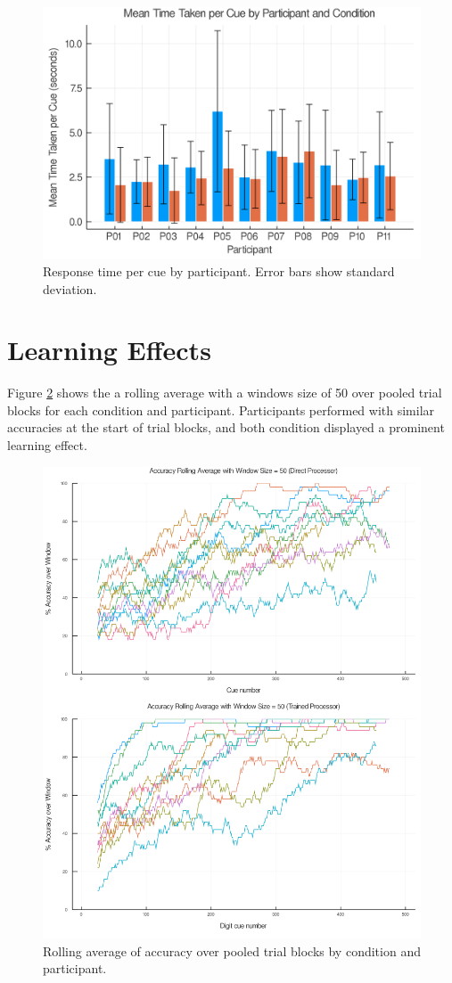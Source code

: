 \documentclass[a4paper,11pt,openany]{book}
\begin{document}
\begin{figure}[htbp]
\centering
\includegraphics[width=.9\linewidth]{./images/response_time_by_participant.png}
\caption{\label{fig:org4ec77b7}
Response time per cue by participant. Error bars show standard deviation.}
\end{figure}

\section*{Learning Effects}
\label{sec:org931ea48}

Figure \ref{fig:orgdb3e0e8} shows the a rolling average with a windows size of 50 over pooled trial blocks for each condition and participant.
Participants performed with similar accuracies at the start of trial blocks, and both condition displayed a prominent learning effect.

\begin{figure}[htbp]
\centering
\includegraphics[width=.9\linewidth]{./images/learning_curves.png}
\caption{\label{fig:orgdb3e0e8}
Rolling average of accuracy over pooled trial blocks by condition and participant.}
\end{figure}
\end{document}
